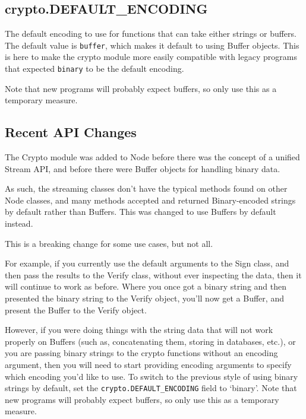 \subsection{crypto.DEFAULT\_ENCODING}\label{crypto.defaultux5fencoding}

The default encoding to use for functions that can take either strings
or buffers. The default value is
\texttt{\textquotesingle{}buffer\textquotesingle{}}, which makes it
default to using Buffer objects. This is here to make the crypto module
more easily compatible with legacy programs that expected
\texttt{\textquotesingle{}binary\textquotesingle{}} to be the default
encoding.

Note that new programs will probably expect buffers, so only use this as
a temporary measure.

\subsection{Recent API Changes}\label{recent-api-changes}

The Crypto module was added to Node before there was the concept of a
unified Stream API, and before there were Buffer objects for handling
binary data.

As such, the streaming classes don't have the typical methods found on
other Node classes, and many methods accepted and returned
Binary-encoded strings by default rather than Buffers. This was changed
to use Buffers by default instead.

This is a breaking change for some use cases, but not all.

For example, if you currently use the default arguments to the Sign
class, and then pass the results to the Verify class, without ever
inspecting the data, then it will continue to work as before. Where you
once got a binary string and then presented the binary string to the
Verify object, you'll now get a Buffer, and present the Buffer to the
Verify object.

However, if you were doing things with the string data that will not
work properly on Buffers (such as, concatenating them, storing in
databases, etc.), or you are passing binary strings to the crypto
functions without an encoding argument, then you will need to start
providing encoding arguments to specify which encoding you'd like to
use. To switch to the previous style of using binary strings by default,
set the \texttt{crypto.DEFAULT\_ENCODING} field to `binary'. Note that
new programs will probably expect buffers, so only use this as a
temporary measure.
